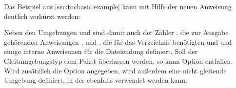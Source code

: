 \begin{Example}
  Das Beispiel aus \autoref{sec:tocbasic.example} kann mit Hilfe der neuen
  Anweisung deutlich verkürzt werden:
\begin{lstcode}
\end{lstcode}
  Neben den Umgebungen  und 
  sind damit auch der Zähler , die zur Ausgabe gehörenden
  Anweisungen ,  und
  , die für das Verzeichnis benötigten
   und  %
  \iffalse %
  sowie einige intern verwendete Anweisungen mit Bezug auf %
  \else%
  und einige interne Anweisunen für %
  \fi%
  die Dateiendung  definiert. Soll der Gleitumgebungstyp dem Paket
  überlassen werden, so kann Option  \iffalse im Beispiel \fi
  entfallen. Wird zusätzlich die Option  angegeben, wird
  außerdem eine nicht gleitende Umgebung  definiert,
  in der ebenfalls  verwendet
  werden kann.


\end{Example}

